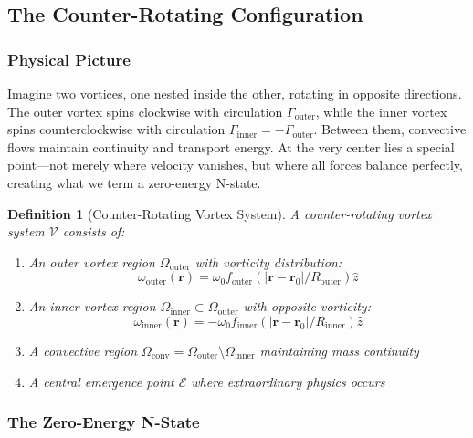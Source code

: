 \documentclass[12pt]{article}
\newcommand{\emergencept}{\mathcal{E}}
\newcommand{\vorticity}{\omega}
\newtheorem{definition}[theorem]{Definition}
\begin{document}
\subsection{The Counter-Rotating Configuration}

\subsubsection{Physical Picture}

Imagine two vortices, one nested inside the other, rotating in opposite directions. The outer vortex spins clockwise with circulation $\Gamma_{\text{outer}}$, while the inner vortex spins counterclockwise with circulation $\Gamma_{\text{inner}} = -\Gamma_{\text{outer}}$. Between them, convective flows maintain continuity and transport energy. At the very center lies a special point—not merely where velocity vanishes, but where all forces balance perfectly, creating what we term a zero-energy N-state.

\begin{definition}[Counter-Rotating Vortex System]
A counter-rotating vortex system $\mathcal{V}$ consists of:
\begin{enumerate}
\item An outer vortex region $\Omega_{\text{outer}}$ with vorticity distribution:
\begin{equation}
\vorticity_{\text{outer}}(\mathbf{r}) = \vorticity_0 f_{\text{outer}}(|\mathbf{r} - \mathbf{r}_0|/R_{\text{outer}}) \hat{z}
\end{equation}

\item An inner vortex region $\Omega_{\text{inner}} \subset \Omega_{\text{outer}}$ with opposite vorticity:
\begin{equation}
\vorticity_{\text{inner}}(\mathbf{r}) = -\vorticity_0 f_{\text{inner}}(|\mathbf{r} - \mathbf{r}_0|/R_{\text{inner}}) \hat{z}
\end{equation}

\item A convective region $\Omega_{\text{conv}} = \Omega_{\text{outer}} \setminus \Omega_{\text{inner}}$ maintaining mass continuity

\item A central emergence point $\emergencept$ where extraordinary physics occurs
\end{enumerate}
\end{definition}

\subsubsection{The Zero-Energy N-State}
\end{document}

